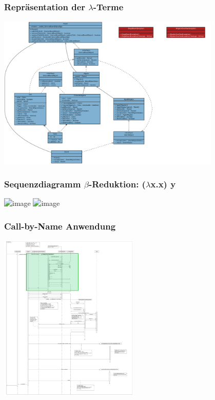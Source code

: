 \documentclass[t]{beamer}
\begin{document}
\begin{frame}
	\frametitle{Repräsentation der \(\lambda\)-Terme}
	\begin{center}
		\includegraphics[width=0.8\textwidth]{umlAwesome.png}
	\end{center}
\end{frame}

\begin{frame}
	\frametitle{Sequenzdiagramm \(\beta\)-Reduktion: (\(\lambda\)x.x) y}
	\begin{center}
	\includegraphics<1>[width= 0.4\textwidth]{Alligator1.png}
	\includegraphics<2>[width=0.5\textwidth]{Beta-Reduktion.png}
	\end{center}
\end{frame}

\begin{frame}
	\frametitle{Call-by-Name Anwendung}
	\begin{center}
	\includegraphics[width=0.5\textwidth]{Beta-Reduktion-withGreen.png}
	\end{center}
\end{frame}
\end{document}

